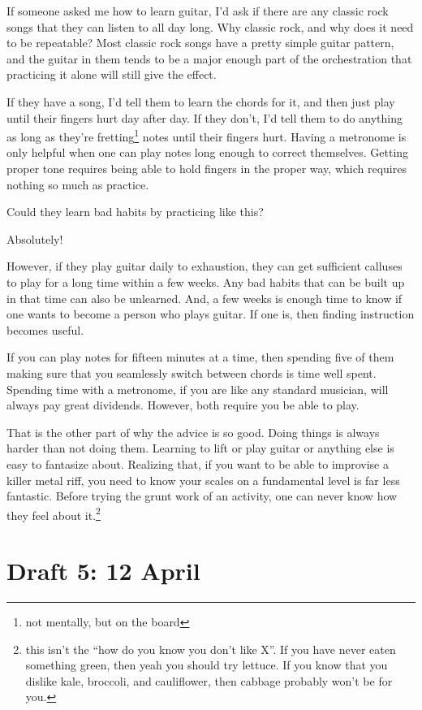 \documentclass[12pt]{article}
\newcommand{\say}[1]{``#1''}
\renewcommand{\,}{\textsuperscript{,}}
\begin{document}
If someone asked me how to learn guitar, I'd ask if there are any classic rock songs that they can listen to all day long.  
Why classic rock, and why does it need to be repeatable?  
Most classic rock songs have a pretty simple guitar pattern, and the guitar in them tends to be a major enough part of the orchestration that practicing it alone will still give the effect.

If they have a song, I'd tell them to learn the chords for it, and then just play until their fingers hurt day after day.  
If they don't, I'd tell them to do anything as long as they're fretting\footnote{not mentally, but on the board} notes until their fingers hurt.  
Having a metronome is only helpful when one can play notes long enough to correct themselves.  
Getting proper tone requires being able to hold fingers in the proper way, which requires nothing so much as practice.

Could they learn bad habits by practicing like this?

Absolutely!

However, if they play guitar daily to exhaustion, they can get sufficient calluses to play for a long time within a few weeks.  
Any bad habits that can be built up in that time can also be unlearned.  
And, a few weeks is enough time to know if one wants to become a person who plays guitar.  
If one is, then finding instruction becomes useful.

If you can play notes for fifteen minutes at a time, then spending five of them making sure that you seamlessly switch between chords is time well spent.  
Spending time with a metronome, if you are like any standard musician, will always pay great dividends.  
However, both require you be able to play.

That is the other part of why the advice is so good.  
Doing things is always harder than not doing them.  
Learning to lift or play guitar or anything else is easy to fantasize about.  
Realizing that, if you want to be able to improvise a killer metal riff, you need to know your scales on a fundamental level is far less fantastic.  
Before trying the grunt work of an activity, one can never know how they feel about it.\footnote{this isn't the \say{how do you know you don't like X}. If you have never eaten something green, then yeah you should try lettuce. If you know that you dislike kale, broccoli, and cauliflower, then cabbage probably won't be for you.}

\section{Draft 5: 12 April}
\end{document}
